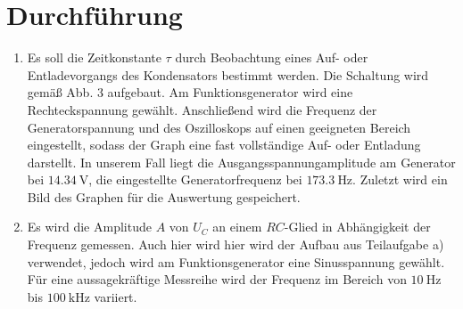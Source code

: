 \section{Durchführung}
\label{sec:Durchführung}


\renewcommand{\labelenumi}{\alph{enumi})}
\begin{enumerate}
  \item Es soll die Zeitkonstante $\tau$ durch Beobachtung eines Auf- oder Entladevorgangs
  des Kondensators bestimmt werden. Die Schaltung wird gemäß Abb. 3 aufgebaut. Am Funktionsgenerator wird eine Rechteckspannung gewählt.
  Anschließend wird die Frequenz der Generatorspannung und des Oszilloskops auf einen
  geeigneten Bereich eingestellt, sodass der Graph eine fast vollständige Auf- oder Entladung darstellt. In unserem Fall
  liegt die Ausgangsspannungamplitude am Generator bei $\SI{14.34}{\volt}$,
   die eingestellte Generatorfrequenz bei $\SI{173.3}{\hertz}$. Zuletzt wird ein Bild des Graphen für die
  Auswertung gespeichert.%

  \item Es wird die Amplitude $A$ von $U_C$ an einem $RC$-Glied in Abhängigkeit der Frequenz gemessen. Auch hier wird
  hier wird der Aufbau aus Teilaufgabe a) verwendet, jedoch wird am Funktionsgenerator eine Sinusspannung gewählt.
   Für eine aussagekräftige Messreihe wird der Frequenz im Bereich von
    $\SI{10}{\hertz}$ bis $\SI{100}{\kilo\hertz}$ variiert.%



\end{enumerate}
